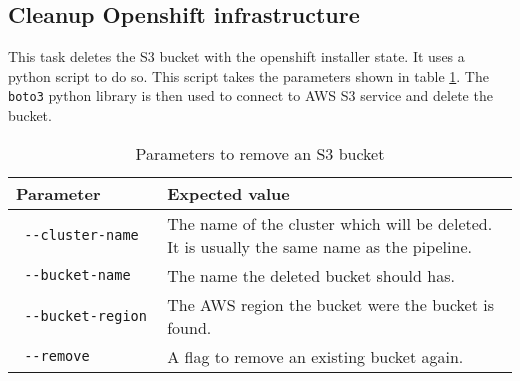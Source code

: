 \subsection{Cleanup Openshift infrastructure}\label{subsec:cleanup-openshift-infrastructure}

This task deletes the S3 bucket with the openshift installer state.
It uses a python script to do so.
This script takes the parameters shown in table \ref{tab:params-remove-s3-bucket}.
The \verb|boto3| python library is then used to connect to AWS S3 service and delete the bucket.

\begin{table}[H]
    \centering
    \caption{Parameters to remove an S3 bucket}
    \label{tab:params-remove-s3-bucket}
    \begin{tabular}{p{0.3\linewidth}|p{0.7\linewidth}}
        Parameter & Expected value \\
        \hline
        \verb| --cluster-name | & The name of the cluster which will be deleted.
            It is usually the same name as the pipeline. \\
        \verb| --bucket-name | & The name the deleted bucket should has. \\
        \verb| --bucket-region | & The AWS region the bucket were the bucket is found. \\
        \verb| --remove | & A flag to remove an existing bucket again. \\
    \end{tabular}
\end{table}

